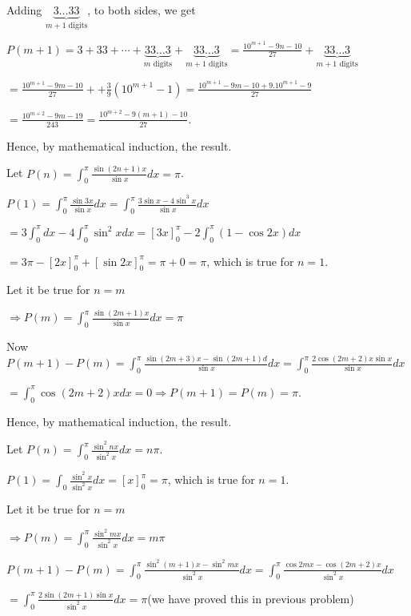   Adding $\underbrace{3\ldots33}_{m + 1\text{~digits}}$, to both sides, we get

  $P(m + 1) = 3 + 33 + \cdots + \underbrace{33\ldots3}_{m\text{~digits}} +
  \underbrace{33\ldots3}_{m + 1\text{~digits}} = \frac{10^{m + 1} - 9n - 10}{27} +
  \underbrace{33\ldots3}_{m + 1\text{~digits}}$

  $= \frac{10^{m + 1} - 9m - 10}{27} + + \frac{3}{9}(10^{m + 1} - 1) = \frac{10^{m + 1} - 9m - 10 +
    9.10^{m + 1} - 9}{27}$

  $= \frac{10^{m + 2} - 9m - 19}{243} = \frac{10^{m + 2} -9(m + 1) - 10}{27}$.

  Hence, by mathematical induction, the result.
\item Let $P(n) = \displaystyle\int_{0}^\pi\frac{\sin(2n + 1)x}{\sin x}dx = \pi$.

  $P(1) = \displaystyle\int_0^\pi \frac{\sin 3x}{\sin x}dx = \int_0^\pi\frac{3\sin x - 4\sin^3x}{\sin x}dx$

  $= \displaystyle3\int_0^\pi dx - 4\int_0^\pi\sin^2x dx = [3x]_0^\pi - 2\int_0^\pi(1 - \cos2x)dx$

  $= 3\pi - [2x]_0^\pi + [\sin2x]_0^\pi = \pi + 0 = \pi$, which is true for $n = 1$.

  Let it be true for $n = m$

  $\Rightarrow P(m) = \displaystyle\int_0^\pi \frac{\sin(2m + 1)x}{\sin x}dx = \pi$

  Now $P(m + 1) - P(m) = \displaystyle\int_0^\pi\frac{\sin(2m + 3)x - \sin(2m + 1)d}{\sin x}dx =
  \int_0^\pi\frac{2\cos(2m + 2)x\sin x}{\sin x}dx$

  $= \displaystyle\int_0^\pi \cos(2m + 2)x dx= 0 \Rightarrow P(m + 1) = P(m) = \pi$.

  Hence, by mathematical induction, the result.
\item Let $P(n) = \displaystyle\int_{0}^\pi\frac{\sin^2nx}{\sin^2x}dx = n\pi$.

  $P(1) = \displaystyle\int_0\frac{\sin^2x}{\sin^2x}dx = [x]_0^\pi = \pi$, which is true for $n = 1$.

  Let it be true for $n = m$

  $\Rightarrow P(m) = \displaystyle\int_0^\pi\frac{\sin^2mx}{\sin^2x}dx = m\pi$

  $P(m + 1) - P(m) = \displaystyle\int_0^\pi \frac{\sin^2(m + 1)x - \sin^2mx}{\sin^2x}dx =
  \int_0^\pi\frac{\cos2mx - \cos(2m + 2)x}{\sin^2x}dx$

  $= \displaystyle\int_0^\pi \frac{2\sin(2m + 1)\sin x}{\sin^2x}dx = \pi$(we have proved this in previous
  problem)

